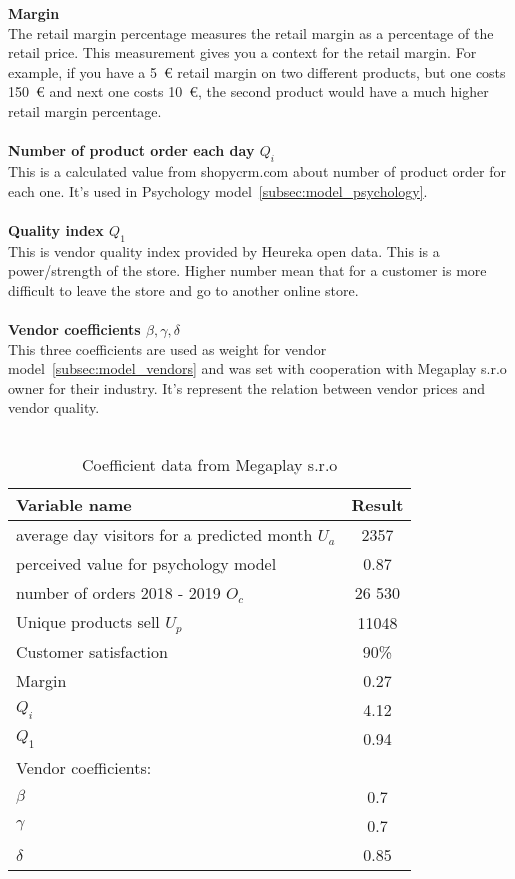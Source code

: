 \textbf{Margin}\\
The retail margin percentage measures the retail margin as a percentage of the retail price.
This measurement gives you a context for the retail margin.
For example, if you have a 5~€ retail margin on two different products, but one costs 150~€ and next one costs 10~€, the second product would have a much higher retail margin percentage.\\
\\
\textbf{Number of product order each day $Q_i$}\\
This is a calculated value from shopycrm.com about number of product order for each one.
It's used in Psychology model~\ref{subsec:model_psychology}. \\
\\
\textbf{Quality index $Q_1$}\\
This is vendor quality index provided by Heureka open data.
This is a power/strength of the store.
Higher number mean that for a customer is more difficult to leave the store and go to another online store.\\
\\
\textbf{Vendor coefficients $\beta, \gamma, \delta$} \label{vendorCoeff}\\
This three coefficients are used as weight for vendor model~\ref{subsec:model_vendors} and was set with cooperation with Megaplay s.r.o owner for their industry.
It's represent the relation between vendor prices and vendor quality.\\
\\
\begin{table}[h!]
    \begin{center}
        \begin{tabular}{ | l | c |}
            \hline
            {\textbf{Variable name}} & \textbf{Result}\\
            \hline
            average day visitors for a predicted month $U_a$& 2357 \\
            perceived value for psychology model & 0.87 \\
            number of orders 2018 - 2019 $O_c$ & 26 530 \\
            Unique products sell $U_p$ & 11048\\
            Customer satisfaction & 90\%\\
            Margin & 0.27\\
            $Q_i$ & 4.12\\
            $Q_1$ & 0.94\\
            Vendor coefficients: & \\
            $\beta$ & 0.7\\
            $\gamma$ & 0.7\\
            $\delta$ & 0.85\\
            \hline
        \end{tabular}
    \end{center}
    \caption{Coefficient data from Megaplay s.r.o}
    \label{megaplay_data}
\end{table}
